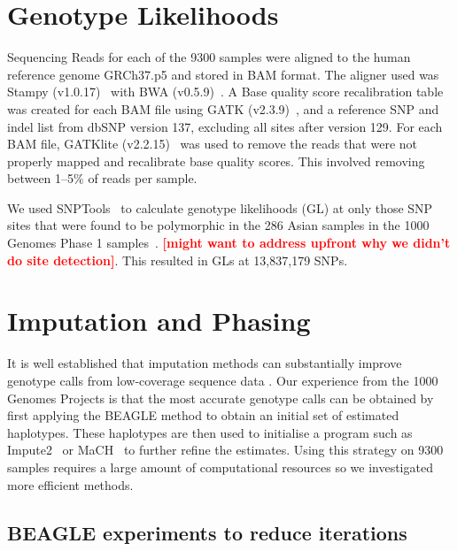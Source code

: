 \documentclass[nobib,a4paper]{tufte-handout}
\newcommand{\red}[1]{\textsf{\textbf{\textcolor{red}{[#1]}}}}
\begin{document}


\section{Genotype Likelihoods}

Sequencing Reads for each of the 9300 samples were aligned to the
human reference genome GRCh37.p5 and stored in BAM format. 
The aligner used was Stampy (v1.0.17)~\autocite{Lunter2011} with
BWA (v0.5.9)~\autocite{Li2009}. 
A Base quality score recalibration table was created for each BAM file
using GATK (v2.3.9)~\autocite{McKenna2010,Trio2011}, and a
reference SNP and indel list from dbSNP version 137, excluding all
  sites after version 129. 
For each BAM file, GATKlite (v2.2.15)~\autocite{McKenna2010,Trio2011} was
used to remove the reads that were not properly mapped and recalibrate
base quality scores. This involved removing between 1--5$\%$ of reads
per sample. 

We used SNPTools~\autocite{Wang2013} to calculate genotype likelihoods (GL) at only those
SNP sites that were found to be polymorphic in the 286 Asian samples
in the 1000 Genomes Phase 1 samples~\autocite{Project2012}. \red{might want to
  address upfront why we didn't do site detection}. This resulted in
GLs at 13,837,179 SNPs. 

\section{Imputation and Phasing}

It is well established that imputation methods can substantially
improve genotype calls from low-coverage sequence data
\autocite{Project2012, Li2010, Wang2013}.
Our experience from the 1000 Genomes Projects is that the most
accurate genotype calls can be obtained by first applying the BEAGLE
method to obtain an initial set of estimated haplotypes. These
haplotypes are then used to initialise a program such as
Impute2~\autocite{Howie2009} or MaCH~\autocite{Li2010} to further refine the
estimates. 
Using this strategy on 9300 samples requires a large amount of
computational resources so we investigated more efficient methods.  

\subsection{BEAGLE experiments to reduce iterations}
\end{document}
